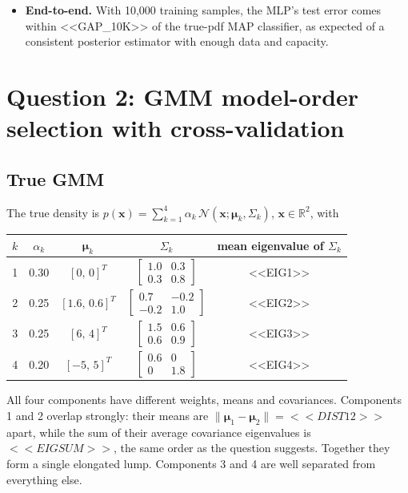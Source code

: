 \documentclass[11pt]{article}
\newcommand{\x}{{\mathbf{x}}}
\begin{document}
\begin{itemize}
\textbf{Does non-convergence affect model selection?} Because many CV fits stopped at the 1000-iteration cap, the CV for $N=500$ and $N=1000$ was repeated with a 5$\times$ larger budget of 5000 iterations, using the same seeds and folds (\texttt{q1\_cv\_sensitivity.py}). <<SENS_TEXT>>
<<SENS_TABLE>>
Running longer leaves small networks unchanged and makes large networks slightly \emph{worse} on held-out data: they fit the training folds more closely. The iteration cap therefore acts as mild implicit regularization on oversized networks, but it does not change which $P$ is selected.
\item \textbf{End-to-end.} With 10{,}000 training samples, the MLP's test error comes within <<GAP_10K>> of the true-pdf MAP classifier, as expected of a consistent posterior estimator with enough data and capacity.
\end{itemize}

\section*{Question 2: GMM model-order selection with cross-validation}

\subsection*{True GMM}
The true density is $p(\x)=\sum_{k=1}^4\alpha_k\,\mathcal N(\x;\bm\mu_k,\Sigma_k)$, $\x\in\mathbb R^2$, with
\begin{center}
\begin{tabular}{ccccc}\toprule
$k$ & $\alpha_k$ & $\bm\mu_k$ & $\Sigma_k$ & mean eigenvalue of $\Sigma_k$\\\midrule
1 & 0.30 & $[0,\,0]^T$ & $\begin{bmatrix}1.0&0.3\\0.3&0.8\end{bmatrix}$ & <<EIG1>>\\[8pt]
2 & 0.25 & $[1.6,\,0.6]^T$ & $\begin{bmatrix}0.7&-0.2\\-0.2&1.0\end{bmatrix}$ & <<EIG2>>\\[8pt]
3 & 0.25 & $[6,\,4]^T$ & $\begin{bmatrix}1.5&0.6\\0.6&0.9\end{bmatrix}$ & <<EIG3>>\\[8pt]
4 & 0.20 & $[-5,\,5]^T$ & $\begin{bmatrix}0.6&0\\0&1.8\end{bmatrix}$ & <<EIG4>>\\\bottomrule
\end{tabular}
\end{center}
All four components have different weights, means and covariances. Components 1 and 2 overlap strongly: their means are $\|\bm\mu_1-\bm\mu_2\|=<<DIST12>>$ apart, while the sum of their average covariance eigenvalues is $<<EIGSUM>>$, the same order as the question suggests. Together they form a single elongated lump. Components 3 and 4 are well separated from everything else.
\end{document}
